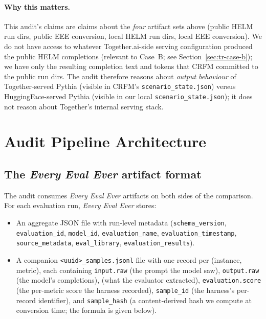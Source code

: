 \documentclass[11pt]{article}
\newcommand{\eee}{\textit{Every Eval Ever}\xspace}
\begin{document}
\paragraph{Why this matters.}
This audit's claims are claims about the \emph{four} artifact sets
  above (public HELM run dirs, public EEE conversion, local HELM run
  dirs, local EEE conversion).
We do not have access to whatever Together.ai-side serving
  configuration produced the public HELM completions
  (relevant to Case~B; see Section~\ref{sec:tr-case-b}); we have only
  the resulting completion text and tokens that CRFM committed to the
  public run dirs.
The audit therefore reasons about \emph{output behaviour} of
  Together-served Pythia (visible in CRFM's
  \texttt{scenario\_state.json}) versus HuggingFace-served Pythia
  (visible in our local \texttt{scenario\_state.json}); it does not
  reason about Together's internal serving stack.


\section{Audit Pipeline Architecture}
\label{sec:tr-pipeline}

\subsection{The \eee{} artifact format}
\label{sec:tr-eee-format}

The audit consumes \eee{} artifacts on both sides of the comparison.
For each evaluation run, \eee{} stores:
\begin{itemize}
  \item An aggregate JSON file with run-level metadata
        (\texttt{schema\_version}, \texttt{evaluation\_id},
        \texttt{model\_id}, \texttt{evaluation\_name},
        \texttt{evaluation\_timestamp}, \texttt{source\_metadata},
        \texttt{eval\_library},
        \texttt{evaluation\_results}).
  \item A companion \texttt{<uuid>\_samples.jsonl} file with one
        record per (instance, metric), each containing
        \texttt{input.raw} (the prompt the model saw),
        \texttt{output.raw} (the model's completions),
         (what the
        evaluator extracted),
        \texttt{evaluation.score} (the per-metric score the harness
        recorded),
        \texttt{sample\_id} (the harness's per-record identifier),
        and \texttt{sample\_hash} (a content-derived hash we compute
        at conversion time; the formula is given below).
\end{itemize}
\end{document}
